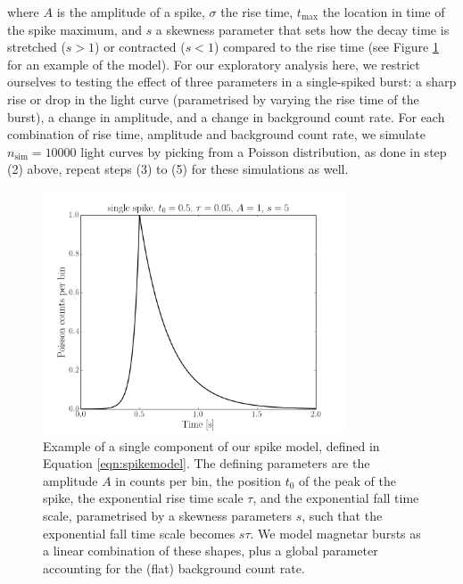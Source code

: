 \documentclass[numberedappendix]{emulateapj}
\begin{document}
where $A$ is the amplitude of a spike, $\sigma$ the rise time, $t_\mathrm{max}$ the location in time of the spike maximum, and $s$ a skewness parameter that sets how the decay time is stretched ($s > 1$) or contracted ($s < 1$) compared to the rise time (see Figure \ref{fig:example_spike} for an example of the model). 
For our exploratory analysis here, we restrict ourselves to testing the effect of three parameters in a single-spiked burst: a sharp rise or drop in the light curve (parametrised by varying the rise time of the burst), a change in amplitude, and a change in background count rate. For each combination of rise time, amplitude and 
background count rate, we simulate $n_{\mathrm{sim}} = 10000$  light curves by picking from a Poisson distribution, as done in step (2) above, repeat steps (3) to (5) for these simulations as well. 
\begin{figure}[htbp]
\begin{center}
\includegraphics[width=9cm]{example_spike.png}
\caption{Example of a single component of our spike model, defined in Equation \ref{eqn:spikemodel}. The defining parameters are the amplitude $A$ in counts per bin, the position $t_0$ of the peak of the spike,  the exponential rise time scale $\tau$, and the exponential fall time scale, parametrised by a skewness parameters $s$, such that the exponential fall time scale becomes $s\tau$. We model magnetar bursts as a linear combination of these shapes, plus a global parameter accounting for the (flat) background count rate.}
\label{fig:example_spike}
\end{center}
\end{figure}
\end{document}
